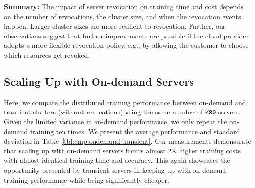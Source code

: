 \textbf{Summary:} The impact of server revocation on training time and
cost depends on the  number of revocations, the cluster size, and when
the revocation events happen. Larger cluster sizes are more resilient to
revocation. Further, our observations suggest that further improvements are
possible if the cloud provider adopts a more flexible revocation policy, e.g.,
by allowing the customer to choose which resources
get revoked.
 






\subsection{Scaling Up with On-demand Servers}


Here, we compare the distributed training performance
between on-demand and transient clusters (without revocations) using the same number of \texttt{K80} servers. 
Given the limited variance in on-demand
performance, we only repeat the  on-demand training ten times. We present the
average performance and standard deviation in
Table~\ref{tbl:cmp:ondemand:transient}.  Our measurements demonstrate that
scaling up with on-demand servers incurs almost 2X higher training costs with
almost identical training time and accuracy.  This again showcases the 
opportunity presented by transient servers in keeping up with on-demand
training performance while being significantly cheaper. 

